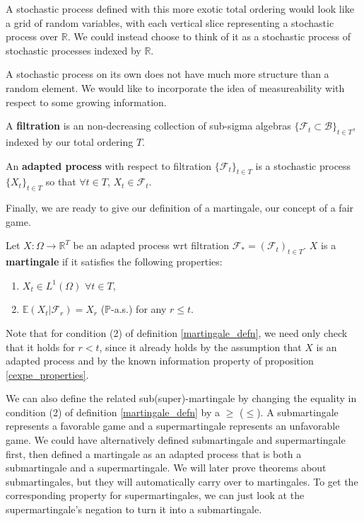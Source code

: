 A stochastic process defined with this more exotic total ordering would look like a grid of random variables, with each vertical slice representing a stochastic process over \(\mathbb{R}\). We could instead choose to think of it as a stochastic process of stochastic processes indexed by \(\mathbb{R}\).

A stochastic process on its own does not have much more structure than a random element. We would like to incorporate the idea of measureability with respect to some growing information.

\begin{definition}
    A \textbf{filtration} is an non-decreasing collection of sub-sigma algebras \(\{\mathcal{F}_{t} \subset \mathcal{B}\}_{t \in T}\), indexed by our total ordering \(T\).
\end{definition}

\begin{definition}
    An \textbf{adapted process} with respect to filtration \(\{\mathcal{F}_{t}\}_{t \in T}\) is a stochastic process \(\{X_{t}\}_{t \in T}\) so that \(\forall t \in T\), \(X_{t} \in \mathcal{F}_{t}\).
\end{definition}

Finally, we are ready to give our definition of a martingale, our concept of a fair game.

\begin{definition}
    \label{martingale_defn}
    Let $X: \Omega \to \mathbb{R}^{T}$ be an adapted process wrt filtration $\mathcal{F}_{*} = (\mathcal{F}_{t})_{t \in T}$. $X$ is a \textbf{martingale} if it satisfies the following properties:
    \begin{enumerate}
        \item $X_{t} \in L^{1}(\Omega)$ $\forall t \in T$,
        \item $\mathbb{E}(X_{t} | \mathcal{F}_{r}) = X_{r}$ (\(\mathbb{P}\)-a.s.) for any $r \leq t$.
    \end{enumerate}
\end{definition}

Note that for condition (2) of definition \ref{martingale_defn}, we need only check that it holds for \(r < t\), since it already holds by the assumption that \(X\) is an adapted process and by the known information property of proposition \ref{cexpe_properties}.

We can also define the related sub(super)-martingale by changing the equality in condition (2) of definition \ref{martingale_defn} by a \(\geq\) (\(\leq\)). A submartingale represents a favorable game and a supermartingale represents an unfavorable game. We could have alternatively defined submartingale and supermartingale first, then defined a martingale as an adapted process that is both a submartingale and a supermartingale. We will later prove theorems about submartingales, but they will automatically carry over to martingales. To get the corresponding property for supermartingales, we can just look at the supermartingale's negation to turn it into a submartingale.

